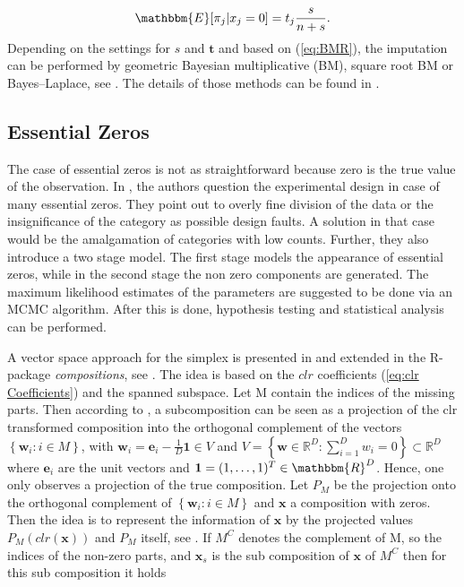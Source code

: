 \begin{equation}
\mathbbm{E}[\pi_j|x_j=0]=t_j \frac{s}{n+s}.
\label{eq:BMR}
\end{equation}
%
Depending on the settings for $s$ and $\bm{t}$ and based on (\ref{eq:BMR}), the imputation can be performed by geometric Bayesian multiplicative (BM), square root BM or Bayes–Laplace, see \textcite{Palarea-Albaladejo:2015}. The details of those methods can be found in \textcite{Fernandez:2015}. 


\subsection{Essential Zeros}
\label{sec: Essential Zeros}

The case of essential zeros is not as straightforward because zero is the true value of the observation. In \textcite{Aitchison:2003}, the authors question the experimental design in case of many essential zeros. They point out to overly fine division of the data or the insignificance of the category as possible design faults. A solution in that case would be the amalgamation of categories with low counts. Further, they also introduce a two stage model. The first stage models the appearance of essential zeros, while in the second stage the non zero components are generated. The maximum likelihood estimates of the parameters are suggested to be done via an MCMC algorithm. After this is done, hypothesis testing and statistical analysis can be performed. 

A vector space approach for the simplex is presented in \textcite{Boogaart:2006} and extended in the R-package \textit{compositions}, see \textcite{Compositions:2023}. The idea is based on the $clr$ coefficients (\ref{eq:clr Coefficients}) and the spanned subspace. Let M contain the indices of the missing parts. Then according to \textcite{Egozcue:2005}, a subcomposition can be seen as a projection of the clr transformed composition into the orthogonal complement of the vectors $\left\{\bm{w}_i: i \in M\right\}$, with $\bm{w}_i = \bm{e}_i - \frac{1}{D}\bm{1} \in V$ and $V = \left\{\textbf{w} \in \mathbb{R}^D: \sum_{i=1}^D w_i=0\right\} \subset \mathbb{R}^D$ where $\bm{e}_i$ are the unit vectors and $\bm{1}=(1,\ldots,1)^T \in \mathbbm{R}^D$. Hence, one only observes a projection of the true composition. Let $P_M$ be the projection onto the orthogonal complement of $\left\{\bm{w}_i: i \in M\right\}$ and $\bm{x}$ a composition with zeros. Then the idea is to represent the information of $\bm{x}$ by the projected values $P_M(clr(\bm{x}))$ and $P_M$ itself, see \textcite{Boogaart:2006}. If $M^C$ denotes the complement of M, so the indices of the non-zero parts, and $\bm{x}_s$ is the sub composition of $\bm{x}$ of $M^C$ then for this sub composition it holds 

